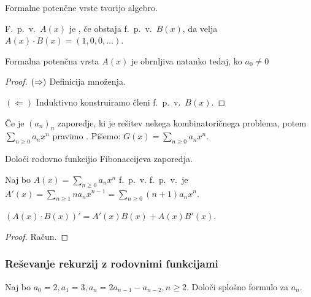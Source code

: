 \begin{opomba}
    Formalne potenčne vrste tvorijo algebro.
\end{opomba}

\begin{definicija}
    F.\ p.\ v.\ $A(x)$ je , če obstaja f.\ p.\ v.\ $B(x)$, da velja $A(x) \cdot B(x) = (1, 0, 0, \ldots)$.
\end{definicija}

\begin{trditev}
    Formalna potenčna vrsta $A(x)$ je obrnljiva natanko tedaj, ko $a_0 \neq 0$
\end{trditev}

\begin{proof}
    $(\Rightarrow)$ Definicija množenja.

    $(\Leftarrow)$ Induktivno konstruiramo členi f.\ p.\ v.\ $B(x)$.
\end{proof}

\begin{definicija}
    Če je $(a_n)_n$ zaporedje, ki je rešitev nekega kombinatoričnega problema, potem $\sum_{n \geq 0}a_n x^n$ pravimo . Pišemo: $G(x) = \sum_{n \geq 0}a_n x^n$.
\end{definicija}

\begin{primer}
    Določi rodovno funkcijio Fibonaccijeva zaporedja.
\end{primer}

\begin{definicija}
    Naj bo $A(x) = \sum_{n \geq 0}a_n x^n$ f.\ p.\ v.  f.\ p.\ v.\ je $A'(x) =  \sum_{n \geq 1}na_n x^{n-1} =  \sum_{n \geq 0}(n+1)a_n x^n$.
\end{definicija}

\begin{trditev}
    $(A(x) \cdot B(x))' = A'(x)B(x) + A(x)B'(x)$.
\end{trditev}

\begin{proof}
    Račun.
\end{proof}

\subsubsection*{Reševanje rekurzij z rodovnimi funkcijami}
\begin{primer}
    Naj bo $a_0 = 2, a_1 = 3, a_n = 2a_{n-1}-a_{n-2}, n \geq 2$. Določi splošno formulo za $a_n$.
\end{primer}
